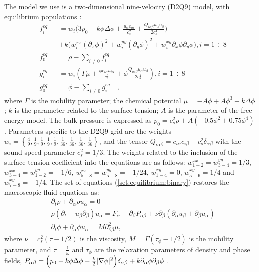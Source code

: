 \documentclass[preprint,12pt]{elsarticle}
\begin{document}
The model we use is a two-dimensional nine-velocity (D2Q9) model,
with equilibrium populations \cite{pooley-contact}:
\begin{equation}
\label{set:equilibrium:binary}
\begin{aligned}
&f_i^{eq}&&=w_i 
\biggl(3
p_0 - k \phi \Delta \phi
+\frac{u_{\alpha}c_{i\alpha}}{c_s^2}+\frac{Q_{i\alpha\beta}u_{\alpha } u_ {
\beta}}{2 c_s^4}\biggr)\\
&&&+k\bigl(w_i^{xx} (\partial_x \phi)^2+w_i^{yy} (\partial_y \phi)^2 +w_i^{xy} \partial_x
\phi \partial_y \phi \bigr), i=1\div8\\
&f_0^{eq}&&=\rho-\sum_{i\neq0}{f_i^{eq}}\\
&g_i^{eq}&&=w_i\left(\Gamma \mu + \frac{\phi c_{i\alpha} u_{i\alpha}}{c_s^2}+\phi
\frac{Q_{i\alpha\beta}u_{\alpha}u_{\beta}}{2 c_s^4}\right), i=1\div8 \\
&g_0^{eq}&&=\phi-\sum_{i\neq0}{g_i^{eq}}\quad,
\end{aligned}
\end{equation}
where $\Gamma$ is the mobility parameter; the chemical potential
$\mu=-A\phi+A\phi^3-k\Delta\phi$; $k$ is the parameter related to the surface
tension; $A$ is the parameter of the free-energy model. The bulk pressure
is expressed as $p_0=c_s^2 \rho +A (-0.5 \phi^2+0.75 \phi^4)$. 
Parameters specific to the D2Q9 grid are the weights
$w_i=\left\{\frac{4}{9},\frac{1}{9},\frac{1}{9},\frac{1}{9},\frac{1}{9},
\frac{1}{36},\frac{1}{36},\frac{1}{36},\frac{1}{36}\right\}$, and the tensor
$Q_{i\alpha\beta}=c_{i\alpha} c_{i\beta} - c_s^2 \delta_{\alpha\beta}$ with
the sound speed parameter $c_s^2=1/3$.  The weights related to the
inclusion of the surface tension coefficient into the equations are as follows:
$w^{xx}_{1-2}=w^{yy}_{3-4}=1/3$, $w^{xx}_{3-4}=w^{yy}_{1-2}=-1/6$,
$w^{xx}_{5-8}=w^{yy}_{5-8}=-1/24$, $w^{xy}_{1-4}=0$, $w^{xy}_{5-6}=1/4$ and
$w^{xy}_{7-8}=-1/4$. The set of equations (\ref{set:equilibrium:binary}) restores the
macroscopic
fluid equations as:
\begin{equation}
\begin{aligned}
&\partial_t \rho+ \partial_{\alpha} \rho u_{\alpha}=0\\
&\rho\left(\partial_t+u_{\beta}\partial_{\beta}\right) u_{\alpha}= F_{\alpha}
-\partial_{\beta}P_{\alpha \beta} +
\nu\partial_{\beta}\left(\partial_{\alpha}u_{\beta}+\partial_{\beta} u_{\alpha}\right)\\
&\partial_t \phi + \partial_{\alpha} \phi u_{\alpha}=M \partial^2_{\beta\beta} \mu,
\end{aligned}
\label{binary:fluid:system}
\end{equation}
where $\nu=c_s^2 (\tau-1/2)$ is the viscosity,
$M=\Gamma(\tau_{\phi}-1/2)$ is the mobility parameter, and $\tau=\frac{1}{\omega}$ and $\tau_{\phi}$
are the relaxation parameters of density and phase fields, {\color{red}
$P_{\alpha\beta}=\Bigl(p_0-k\phi \Delta \phi -\frac{k}{2}|\nabla \phi|^2\Bigr)\delta_{\alpha\beta}
+ k \partial_{\alpha} \phi \partial_{\beta} \phi$  \cite{pooley-contact}.} 
\end{document}
